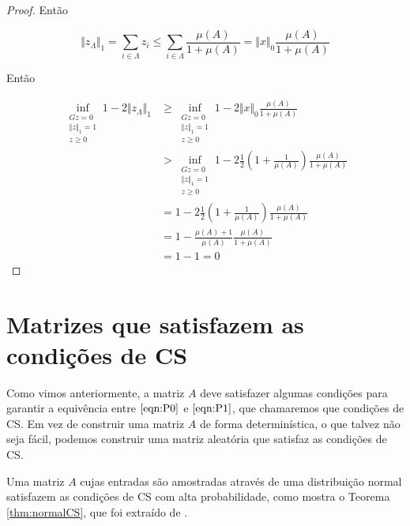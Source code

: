 \begin{proof}
Então

$$ \Vert z_\Lambda \Vert_1
= \sum_{i \in \Lambda} z_i
\leq \sum_{i \in \Lambda} \frac{\mu(A)}{1 + \mu(A)}
= \Vert x \Vert_0 \frac{\mu(A)}{1 + \mu(A)}
$$

Então

\begin{subequations}
\begin{align*}
\inf_{\substack{Gz = 0 \\ \Vert z \Vert_1 = 1 \\ z \geq 0}}
1 - 2 \Vert z_\Lambda \Vert_1
& \geq
\inf_{\substack{Gz = 0 \\ \Vert z \Vert_1 = 1 \\ z \geq 0}}
1 - 2 \Vert x \Vert_0 \frac{\mu(A)}{1 + \mu(A)} \\
& >
\inf_{\substack{Gz = 0 \\ \Vert z \Vert_1 = 1 \\ z \geq 0}}
1 - 2 \frac{1}{2} \left(1 + \frac{1}{\mu(A)}\right) \frac{\mu(A)}{1 + \mu(A)} \\
& = 1 - 2 \frac{1}{2} \left(1 + \frac{1}{\mu(A)}\right) \frac{\mu(A)}{1 + \mu(A)} \\
& = 1 - \frac{\mu(A) + 1}{\mu(A)} \frac{\mu(A)}{1 + \mu(A)}\\
& = 1 - 1 = 0
\end{align*}
\end{subequations}
\end{proof}

\section{Matrizes que satisfazem as condições de CS}

Como vimos anteriormente, a matriz $A$ deve satisfazer algumas condições para garantir a equivência entre $\eqref{eqn:P0}$ e $\eqref{eqn:P1}$, que chamaremos que condições de CS. Em vez de construir uma matriz $A$ de forma determinística, o que talvez não seja fácil, podemos construir uma matriz aleatória que satisfaz as condições de CS.



Uma matriz $A$ cujas entradas são amostradas através de uma distribuição normal satisfazem as condições de CS com alta probabilidade, como mostra o Teorema \ref{thm:normalCS}, que foi extraído de \cite{zhang2008theory}.


